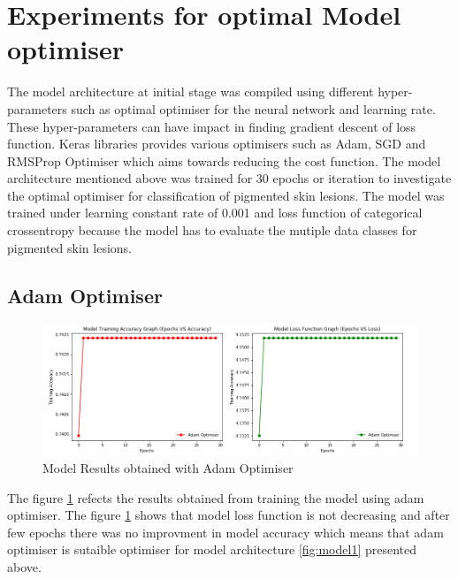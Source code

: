 \section{Experiments for optimal Model optimiser}
The model architecture at initial stage was compiled using different hyper-parameters
such as optimal optimiser for the neural network and learning rate. These 
hyper-parameters can have impact in finding gradient descent of loss function. Keras libraries 
provides various optimisers such as Adam, SGD and RMSProp Optimiser which 
aims towards reducing the cost function. The model architecture mentioned above was trained for 30 epochs or iteration to 
investigate the optimal optimiser for classification of pigmented skin lesions. The model was trained under learning 
constant rate of 0.001 and loss function of categorical crossentropy because the model has to evaluate the mutiple data classes 
for pigmented skin lesions.


\subsection{Adam Optimiser}

\begin{figure}[!htp]
    \centering
    \includegraphics[width=15cm]{Images/Adam Optimiser.png}
    \caption{Model Results obtained with Adam Optimiser}
    \label{fig:adam}
\end{figure}

The figure \ref{fig:adam} refects the results obtained from training the model using adam optimiser. The figure \ref{fig:adam} shows that model loss function 
is not decreasing and after few epochs there was no improvment in model accuracy which means that adam optimiser is sutaible 
optimiser for model architecture \ref{fig:model1} presented above.

\pagebreak

